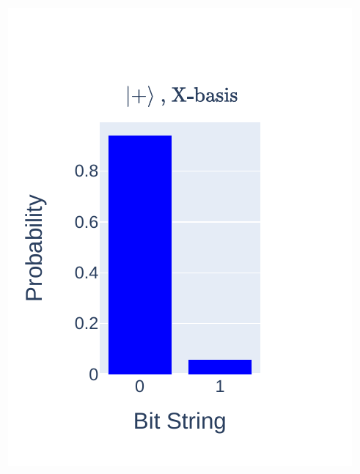 \documentclass[journal]{IEEEtran}
\begin{document}
\begin{figure}
    \centering
    \begin{subfigure}{0.25\textwidth}
        \centering
        \includegraphics[scale=0.8, trim={10 20 10 25 }, clip]{figures/state_teleport/plus_x_results.pdf}
    \end{subfigure}
    \begin{subfigure}{0.2\textwidth}
        \centering

\end{subfigure}
\end{figure}
\end{document}

